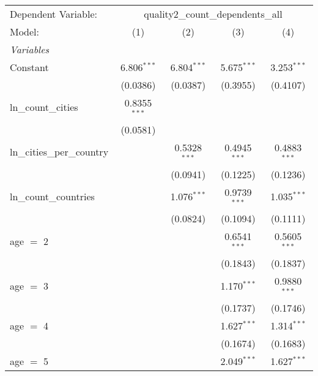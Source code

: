 \begingroup
\centering
\begin{tabular}{lcccc}
   \tabularnewline \midrule \midrule
   Dependent Variable: & \multicolumn{4}{c}{quality2\_count\_dependents\_all}\\
   Model:                               & (1)            & (2)            & (3)             & (4)\\  
   \midrule
   \emph{Variables}\\
   Constant                             & 6.806$^{***}$  & 6.804$^{***}$  & 5.675$^{***}$   & 3.253$^{***}$\\   
                                        & (0.0386)       & (0.0387)       & (0.3955)        & (0.4107)\\   
   ln\_count\_cities                    & 0.8355$^{***}$ &                &                 &   \\   
                                        & (0.0581)       &                &                 &   \\   
   ln\_cities\_per\_country             &                & 0.5328$^{***}$ & 0.4945$^{***}$  & 0.4883$^{***}$\\   
                                        &                & (0.0941)       & (0.1225)        & (0.1236)\\   
   ln\_count\_countries                 &                & 1.076$^{***}$  & 0.9739$^{***}$  & 1.035$^{***}$\\   
                                        &                & (0.0824)       & (0.1094)        & (0.1111)\\   
   age $=$ 2                            &                &                & 0.6541$^{***}$  & 0.5605$^{***}$\\   
                                        &                &                & (0.1843)        & (0.1837)\\   
   age $=$ 3                            &                &                & 1.170$^{***}$   & 0.9880$^{***}$\\   
                                        &                &                & (0.1737)        & (0.1746)\\   
   age $=$ 4                            &                &                & 1.627$^{***}$   & 1.314$^{***}$\\   
                                        &                &                & (0.1674)        & (0.1683)\\   
   age $=$ 5                            &                &                & 2.049$^{***}$   & 1.627$^{***}$\\   

\end{tabular}
